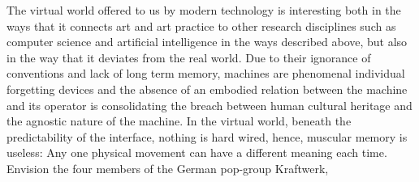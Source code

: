 The virtual world offered to us by modern technology is interesting both in the ways that it connects art and art practice to other research disciplines such as computer science and artificial intelligence in the ways described above, but also in the way that it deviates from the real world. Due to their ignorance of conventions and lack of long term memory, machines are phenomenal individual forgetting devices \citep{miller04} and the absence of an embodied relation between the machine and its operator is consolidating the breach between human cultural heritage and the agnostic nature of the machine. In the virtual world, beneath the predictability of the interface, nothing is hard wired, hence, muscular memory is useless: Any one physical movement can have a different meaning each time. %
Envision the four members of the German pop-group Kraftwerk, %
